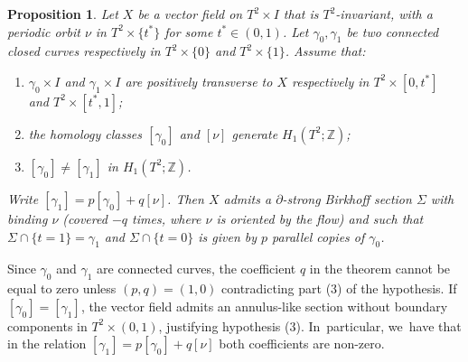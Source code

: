\documentclass[11pt]{article}
\newtheorem{prop}[theorem]{Proposition}
\theoremstyle{definition}
\begin{document}
\begin{prop}\label{prop:helix}
Let $X$ be a vector field on $T^2\times I$ that is $T^2$-invariant, with a periodic orbit $\nu$ in $T^2\times \{t^*\}$ for some $t^*\in(0,1)$. Let $\gamma_0,\gamma_1$ be two connected closed curves respectively in $T^2 \times \{0\}$ and $T^2\times \{1\}$. Assume that:
\begin{enumerate}
\item $\gamma_0\times I$ and $\gamma_1\times I$ are positively transverse to $X$ respectively in $T^2\times [0,t^*]$ and $T^2 \times [t^*,1]$;
\item the homology classes $[\gamma_0]$ and $[\nu]$ generate $H_1(T^2;\mathbb{Z})$;
\item $[\gamma_0]\neq [\gamma_1]$ in $H_1(T^2;\mathbb{Z})$.
\end{enumerate}
Write $[\gamma_1]= p [\gamma_0] + q [\nu]$. Then $X$ admits a $\partial$-strong Birkhoff section $\Sigma$ with binding $\nu$ (covered $-q$ times, where $\nu$ is oriented by the flow) and such that $\Sigma\cap \{t=1\}=\gamma_1$ and $\Sigma \cap \{t=0\}$ is given by $p$ parallel copies of $\gamma_0$.
\end{prop}

{Since $\gamma_0$ and $\gamma_1$ are connected curves, the coefficient $q$ in the theorem cannot be equal to zero unless $(p,q)=(1,0)$ contradicting part (3) of the hypothesis.} If $[\gamma_0]=[\gamma_1]$, the vector field admits an annulus-like section without boundary components in $T^2\times (0,1)$, justifying hypothesis (3). In~particular, we~have that in the relation $[\gamma_1]= p [\gamma_0] + q [\nu]$ both coefficients are non-zero.
\end{document}
